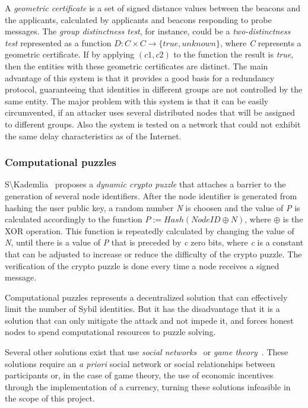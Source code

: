 A \textit{geometric certificate} is a set of signed distance values between the beacons and the applicants, calculated by applicants and beacons responding to probe messages.
The \textit{group distinctness test}, for instance, could be a \textit{two-distinctness test} represented as a function \(D: C\times C\rightarrow \{true, unknown\} \), where \textit{C} represents a geometric certificate. If by applying \((c1,c2)\) to the function the result is \textit{true}, then the entities with these geometric certificates are distinct.
The main advantage of this system is that it provides a good basis for a redundancy protocol, guaranteeing that identities in different groups are not controlled by the same entity.
The major problem with this system is that it can be easily circumvented, if an attacker uses several distributed nodes that will be assigned to different groups.
Also the system is tested on a network that could not exhibit the same delay characteristics as of the Internet.

\subsubsection{Computational puzzles}

S\textbackslash{Kademlia}~\cite{Baumgart2007} proposes a \textit{dynamic crypto puzzle} that attaches a barrier to the generation of several node identifiers.
After the node identifier is generated from hashing the user public key, a random number \textit{N} is choosen and the value of \textit{P} is calculated accordingly to the function \(P := Hash(NodeID \oplus N)\), where \(\oplus\) is the XOR operation.
This function is repeatedly calculated by changing the value of \textit{N}, until there is a value of \textit{P} that is preceded by \textit{c} zero bits, where \textit{c} is a constant that can be adjusted to increase or reduce the difficulty of the crypto puzzle.
The verification of the crypto puzzle is done every time a node receives a signed message.

Computational puzzles represents a decentralized solution that can effectively limit the number of Sybil identities.
But it has the disadvantage that it is a solution that can only mitigate the attack and not impede it, and forces honest nodes to spend computational resources to puzzle solving.

Several other solutions exist that use \textit{social networks}~\cite{Yu2008}\cite{Yu2010} or \textit{game theory}~\cite{Margolin2008}. These solutions require an \textit{a priori} social network or social relationships between participants or, in the case of game theory, the use of economic incentives through the implementation of a currency, turning these solutions infeasible in the scope of this project.

